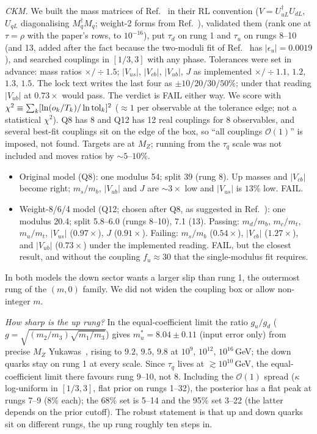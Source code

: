 \documentclass[aps,prd,twocolumn,superscriptaddress,nofootinbib,showkeys]{revtex4-2}
\begin{document}
\textit{CKM.} We built the mass matrices of Ref.~\cite{PT} in their RL convention ($V=U_{uL}^\dagger U_{dL}$, $U_{qL}$ diagonalising $M_q^\dagger M_q$; weight-2 forms from Ref.~\cite{F17}), validated them (rank one at $\tau=\rho$ with the paper's rows, to $10^{-16}$), put $\tau_d$ on rung 1 and $\tau_u$ on rungs 8--10 (and 13, added after the fact because the two-moduli fit of Ref.~\cite{PT} has $|\epsilon_u|=0.0019$), and searched couplings in $[1/3,3]$ with any phase. Tolerances were set in advance: mass ratios $\times/\div1.5$; $|V_{us}|$, $|V_{cb}|$, $|V_{ub}|$, $J$ as implemented $\times/\div1.1$, $1.2$, $1.3$, $1.5$. The lock text writes the last four as $\pm10/20/30/50\%$; under that reading $|V_{ub}|$ at $0.73\times$ would pass. The verdict is FAIL either way. We score with $\chi^2\equiv\sum_k[\ln(o_k/T_k)/\ln{\rm tol}_k]^2$ ($\approx1$ per observable at the tolerance edge; not a statistical $\chi^2$). Q8 has 8 and Q12 has 12 real couplings for 8 observables, and several best-fit couplings sit on the edge of the box, so ``all couplings $\mathcal O(1)$'' is imposed, not found. Targets are at $M_Z$; running from the $\tau_q$ scale was not included and moves ratios by $\sim5$--$10\%$.
\begin{itemize}
\item Original model (Q8): one modulus 54; split 39 (rung 8). Up masses and $|V_{cb}|$ become right; $m_s/m_b$, $|V_{ub}|$ and $J$ are $\sim3\times$ low and $|V_{us}|$ is $13\%$ low. FAIL.
\item Weight-8/6/4 model (Q12; chosen after Q8, as suggested in Ref.~\cite{PT}): one modulus 20.4; split 5.8--6.0 (rungs 8--10), 7.1 (13). Passing: $m_d/m_b$, $m_c/m_t$, $m_u/m_t$, $|V_{us}|$ ($0.97\times$), $J$ ($0.91\times$). Failing: $m_s/m_b$ ($0.54\times$), $|V_{cb}|$ ($1.27\times$), and $|V_{ub}|$ ($0.73\times$) under the implemented reading. FAIL, but the closest result, and without the coupling $f_u\approx30$ that the single-modulus fit requires.
\end{itemize}
In both models the down sector wants a larger slip than rung 1, the outermost rung of the $(m,0)$ family. We did not widen the coupling box or allow non-integer $m$.

\textit{How sharp is the up rung?} In the equal-coefficient limit the ratio $g_u/g_d$ ($g=\sqrt{(m_2/m_3)\sqrt{m_1/m_3}}$) gives $m_u^*=8.04\pm0.11$ (input error only) from precise $M_Z$ Yukawas~\cite{RUN}, rising to $9.2$, $9.5$, $9.8$ at $10^{9}$, $10^{12}$, $10^{16}$\,GeV; the down quarks stay on rung 1 at every scale. Since $\tau_q$ lives at $\gtrsim10^{10}$\,GeV, the equal-coefficient limit there favours rung 9--10, not 8. Including the $\mathcal O(1)$ spread ($\kappa$ log-uniform in $[1/3,3]$, flat prior on rungs 1--32), the posterior has a flat peak at rungs 7--9 ($8\%$ each); the 68\% set is 5--14 and the 95\% set 3--22 (the latter depends on the prior cutoff). The robust statement is that up and down quarks sit on different rungs, the up rung roughly ten steps in.
\end{document}
